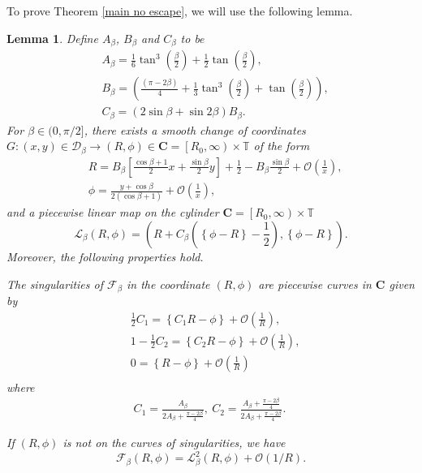 \documentclass{article}
\numberwithin{figure}{section}
\numberwithin{equation}{section}
\newtheorem{lemma}{Lemma}
\theoremstyle{remark}
\theoremstyle{definition}
\begin{document}
To prove Theorem \ref{main no escape}, we will use the following lemma. 
\begin{lemma}\label{keylemma}
	Define $A_\beta$, $B_\beta$ and $C_\beta$ to be
	\begin{align}
		&A_\beta=\frac{1}{6}\tan^3\left(\frac{\beta}{2}\right)+\frac{1}{2}\tan\left(\frac{\beta}{2}\right),\\
		&B_\beta=\left(\frac{(\pi-2\beta)}{4}+\frac{1}{3}\tan^3\left(\frac{\beta}{2}\right)+\tan\left(\frac{\beta}{2}\right)\right),\\
		&C_\beta=(2\sin\beta+\sin2\beta)B_\beta.
	\end{align}
	For $\beta\in(0,\pi/2]$, there exists a smooth change of coordinates $G:(x,y) \in \mathcal{D}_\beta \rightarrow \left(R,\phi\right) \in \textbf{C} = \left[R_0, \infty\right) \times \mathbb{T}$ of the form
	\begin{equation}
		\begin{split}
			&R = B_\beta \left[\frac{\cos\beta+1}{2}x+\frac{\sin\beta}{2}y\right]+\frac{1}{2}-B_\beta\frac{\sin\beta}{2}+\mathcal{O}\left(\frac{1}{x} \right),\\
			& \phi=\frac{y+\cos\beta}{2(\cos\beta+1)}+\mathcal{O}\left( \frac{1}{x}\right),
		\end{split}
	\end{equation}
	and a piecewise linear map on the cylinder $\textbf{C} = \left[R_0, \infty\right) \times \mathbb{T}$
	\begin{equation}
		\mathcal{L}_\beta\left(R,\phi\right)=\left(R+C_\beta\left(\left\{\phi-R\right\}-\frac{1}{2}\right), \left\{\phi-R\right\}\right).
	\end{equation}
	Moreover, the following properties hold.
	\item[$\left( 1\right)$]
	The singularities of $\mathcal{F}_\beta$ in the coordinate $(R,\phi)$ are piecewise curves in $\textbf{C}$ given by 
	\begin{equation}
		\begin{split}
			&\frac{1}{2}C_1=\left\{C_1R-\phi\right\}+\mathcal{O}\left(\frac{1}{R}\right),\\
			&1-\frac{1}{2}C_2=\left\{C_2R-\phi\right\}+\mathcal{O}\left(\frac{1}{R}\right),\\
			&0=\left\{R-\phi\right\}+\mathcal{O}\left(\frac{1}{R}\right)\\
		\end{split}
	\end{equation}
	where
	\begin{align*}
		C_1=\frac{A_\beta}{2A_\beta+\frac{\pi-2\beta}{4}},\ C_2=\frac{A_\beta+\frac{\pi-2\beta}{4}}{2A_\beta+\frac{\pi-2\beta}{4}}.\ 
	\end{align*}
	\item[$\left(2\right) $]
	If $\left(R,\phi\right)$ is not on the curves of singularities, we have
	$$\mathcal{F}_\beta\left(R,\phi\right)=\mathcal{L}_\beta^2\left(R,\phi\right)+\mathcal{O}(1/R).$$
\end{lemma}
\end{document}
